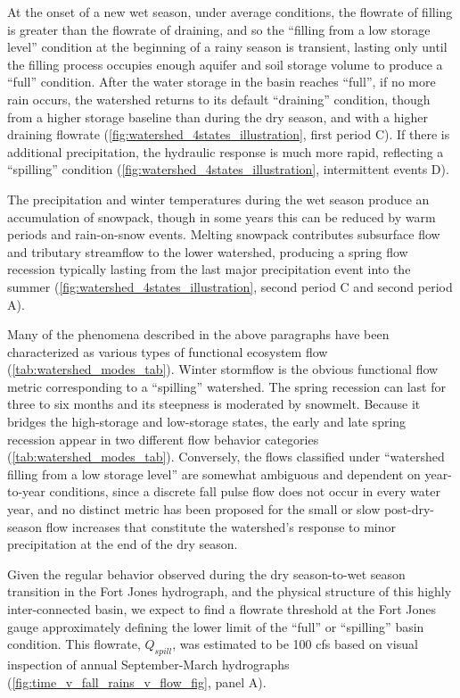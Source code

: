 \documentclass[hess, manuscript]{copernicus}
\begin{document}
At the onset of a new wet season, under average conditions, the flowrate
of filling is greater than the flowrate of draining, and so the
``filling from a low storage level'' condition at the beginning of a
rainy season is transient, lasting only until the filling process
occupies enough aquifer and soil storage volume to produce a ``full''
condition. After the water storage in the basin reaches ``full'', if no
more rain occurs, the watershed returns to its default ``draining''
condition, though from a higher storage baseline than during the dry
season, and with a higher draining flowrate
(\autoref{fig:watershed_4states_illustration}, first period C). If there
is additional precipitation, the hydraulic response is much more rapid,
reflecting a ``spilling'' condition
(\autoref{fig:watershed_4states_illustration}, intermittent events D).

The precipitation and winter temperatures during the wet season produce
an accumulation of snowpack, though in some years this can be reduced by
warm periods and rain-on-snow events. Melting snowpack contributes
subsurface flow and tributary streamflow to the lower watershed,
producing a spring flow recession typically lasting from the last major
precipitation event into the summer
(\autoref{fig:watershed_4states_illustration}, second period C and
second period A).

Many of the phenomena described in the above paragraphs have been
characterized as various types of functional ecosystem flow
(\autoref{tab:watershed_modes_tab}). Winter stormflow is the obvious
functional flow metric corresponding to a ``spilling'' watershed. The
spring recession can last for three to six months and its steepness is
moderated by snowmelt. Because it bridges the high-storage and
low-storage states, the early and late spring recession appear in two
different flow behavior categories (\autoref{tab:watershed_modes_tab}).
Conversely, the flows classified under ``watershed filling from a low
storage level'' are somewhat ambiguous and dependent on year-to-year
conditions, since a discrete fall pulse flow does not occur in every
water year, and no distinct metric has been proposed for the small or
slow post-dry-season flow increases that constitute the watershed's
response to minor precipitation at the end of the dry season.

Given the regular behavior observed during the dry season-to-wet season
transition in the Fort Jones hydrograph, and the physical structure of
this highly inter-connected basin, we expect to find a flowrate
threshold at the Fort Jones gauge approximately defining the lower limit
of the ``full'' or ``spilling'' basin condition. This flowrate,
\(Q_{spill}\), was estimated to be 100 cfs based on visual inspection of
annual September-March hydrographs
(\autoref{fig:time_v_fall_rains_v_flow_fig}, panel A).
\end{document}
